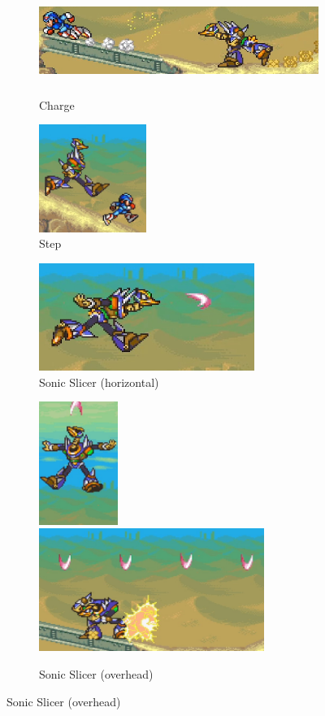 \begin{figure}[htp]
	\centering
	\begin{subfigure}{\linewidth}
		\centering
		\includegraphics[width=0.85\linewidth, height=3.5cm]{figures/X2/Overdrive_ostrich/Ostrich_running.png}
		\caption{Charge}
	\end{subfigure}
	\begin{subfigure}{0.3\linewidth}
		\centering
		\includegraphics[height=3.5cm]{figures/X2/Overdrive_ostrich/Ostrich_run&jump.png}
		\caption{Step}
	\end{subfigure}
	\begin{subfigure}{0.55\linewidth}
		\centering
		\includegraphics[height= 3.5cm,width=\linewidth]{figures/X2/Overdrive_ostrich/Ostrich_sonic_slicer.png}
		\caption{Sonic Slicer (horizontal)}
	\end{subfigure}
	\begin{subfigure}{\linewidth}
		\centering
		\includegraphics[height=4cm]{figures/X2/Overdrive_ostrich/Ostrich_charged_SS.png}
		\includegraphics[height=4cm]{figures/X2/Overdrive_ostrich/Ostrich_charged_SS_2.png}
		\caption{Sonic Slicer (overhead)}
	\end{subfigure}
\end{figure}
